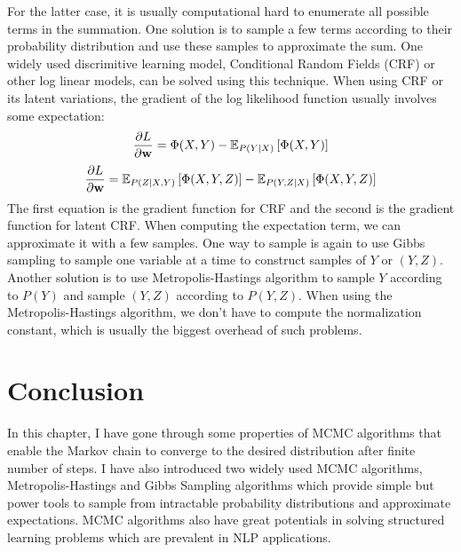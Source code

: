 For the latter case, it is usually computational hard to enumerate all possible terms in the summation. One solution is to sample a few terms according to their probability distribution and use these samples to approximate the sum. 
One widely used discrimitive learning model, Conditional Random Fields (CRF) or other log linear models, can be solved using this technique. When using CRF or its latent variations, the 
gradient of the log likelihood function usually involves some expectation:
$$\frac{\partial{L}}{\partial{{\bf w}}}= \Phi(X, Y) - \mathbb{E}_{P(Y|X)} \left[\Phi(X,Y)\right]$$
$$\frac{\partial{L}}{\partial{{\bf w}}}= \mathbb{E}_{P(Z|X, Y)}\left[\Phi(X, Y, Z)\right] - \mathbb{E}_{P(Y, Z|X)} \left[\Phi(X,Y,Z)\right]$$
The first equation is the gradient function for CRF and the second is the gradient function for latent CRF. When computing the expectation term, we can approximate it with a few samples. One way to
sample is again to use Gibbs sampling to sample one variable at a time to construct samples of $Y$ or $(Y, Z)$. Another solution is to
use Metropolis-Hastings algorithm to sample $Y$ according to $P(Y)$ and sample $(Y, Z)$ according to $P(Y, Z)$. When using the Metropolis-Hastings algorithm, we don't have to compute the normalization constant, which is usually the biggest overhead of such problems.
\section{Conclusion}
In this chapter, I have gone through some properties of MCMC algorithms that enable the Markov chain to converge to the desired distribution after
finite number of steps. I have also introduced two widely used MCMC algorithms, Metropolis-Hastings and Gibbs Sampling algorithms which provide simple but power tools to sample from intractable probability distributions and approximate expectations.
MCMC algorithms also have great potentials in solving structured learning problems which are prevalent in NLP applications.

